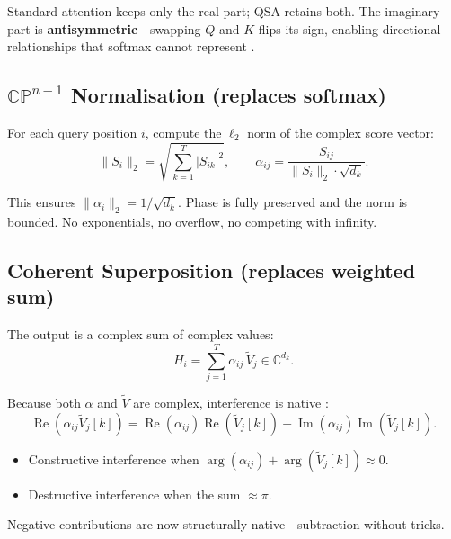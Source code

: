 \documentclass[11pt]{article}
\begin{document}
Standard attention keeps only the real part; QSA retains both. The imaginary part is \textbf{antisymmetric}---swapping \(Q\) and \(K\) flips its sign, enabling directional relationships that softmax cannot represent \cite{qcsam2025}.

\subsection{\(\mathbb{C}\mathbb{P}^{n-1}\) Normalisation (replaces softmax)}

For each query position \(i\), compute the \(\ell_2\) norm of the complex score vector:
\[
\|S_i\|_2 = \sqrt{\sum_{k=1}^{T} |S_{ik}|^2},
\qquad
\alpha_{ij} = \frac{S_{ij}}{\|S_i\|_2 \cdot \sqrt{d_k}}.
\]

This ensures \(\|\alpha_i\|_2 = 1/\sqrt{d_k}\). Phase is fully preserved and the norm is bounded. No exponentials, no overflow, no competing with infinity.

\subsection{Coherent Superposition (replaces weighted sum)}

The output is a complex sum of complex values:
\[
H_i = \sum_{j=1}^{T} \alpha_{ij}\,\tilde{V}_j \in \mathbb{C}^{d_k}.
\]

Because both \(\alpha\) and \(\tilde{V}\) are complex, interference is native \cite{holographic2025}:
\[
\operatorname{Re}(\alpha_{ij}\tilde{V}_j[k])
= \operatorname{Re}(\alpha_{ij})\operatorname{Re}(\tilde{V}_j[k])
  - \operatorname{Im}(\alpha_{ij})\operatorname{Im}(\tilde{V}_j[k]).
\]

\begin{itemize}
    \item Constructive interference when \(\arg(\alpha_{ij}) + \arg(\tilde{V}_j[k]) \approx 0\).
    \item Destructive interference when the sum \(\approx \pi\).
\end{itemize}

Negative contributions are now structurally native---subtraction without tricks.
\end{document}
